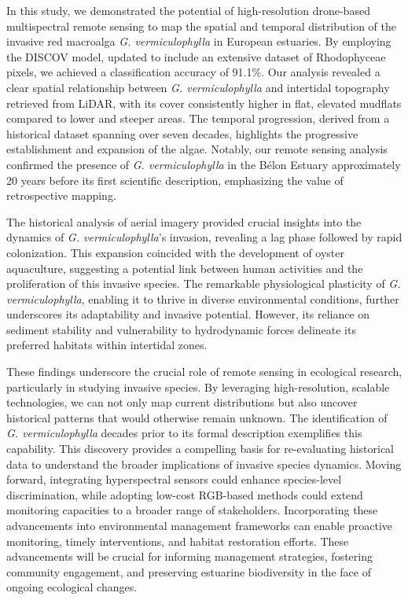 \documentclass[
  letterpaper,
  DIV=11,
  numbers=noendperiod]{scrartcl}
\begin{document}
In this study, we demonstrated the potential of high-resolution
drone-based multispectral remote sensing to map the spatial and temporal
distribution of the invasive red macroalga \emph{G. vermiculophylla} in
European estuaries. By employing the DISCOV model, updated to include an
extensive dataset of Rhodophyceae pixels, we achieved a classification
accuracy of 91.1\%. Our analysis revealed a clear spatial relationship
between \emph{G. vermiculophylla} and intertidal topography retrieved
from LiDAR, with its cover consistently higher in flat, elevated
mudflats compared to lower and steeper areas. The temporal progression,
derived from a historical dataset spanning over seven decades,
highlights the progressive establishment and expansion of the algae.
Notably, our remote sensing analysis confirmed the presence of \emph{G.
vermiculophylla} in the Bélon Estuary approximately 20 years before its
first scientific description, emphasizing the value of retrospective
mapping.

The historical analysis of aerial imagery provided crucial insights into
the dynamics of \emph{G. vermiculophylla}'s invasion, revealing a lag
phase followed by rapid colonization. This expansion coincided with the
development of oyster aquaculture, suggesting a potential link between
human activities and the proliferation of this invasive species. The
remarkable physiological plasticity of \emph{G. vermiculophylla},
enabling it to thrive in diverse environmental conditions, further
underscores its adaptability and invasive potential. However, its
reliance on sediment stability and vulnerability to hydrodynamic forces
delineate its preferred habitats within intertidal zones.

These findings underscore the crucial role of remote sensing in
ecological research, particularly in studying invasive species. By
leveraging high-resolution, scalable technologies, we can not only map
current distributions but also uncover historical patterns that would
otherwise remain unknown. The identification of \emph{G.
vermiculophylla} decades prior to its formal description exemplifies
this capability. This discovery provides a compelling basis for
re-evaluating historical data to understand the broader implications of
invasive species dynamics. Moving forward, integrating hyperspectral
sensors could enhance species-level discrimination, while adopting
low-cost RGB-based methods could extend monitoring capacities to a
broader range of stakeholders. Incorporating these advancements into
environmental management frameworks can enable proactive monitoring,
timely interventions, and habitat restoration efforts. These
advancements will be crucial for informing management strategies,
fostering community engagement, and preserving estuarine biodiversity in
the face of ongoing ecological changes.
\end{document}
